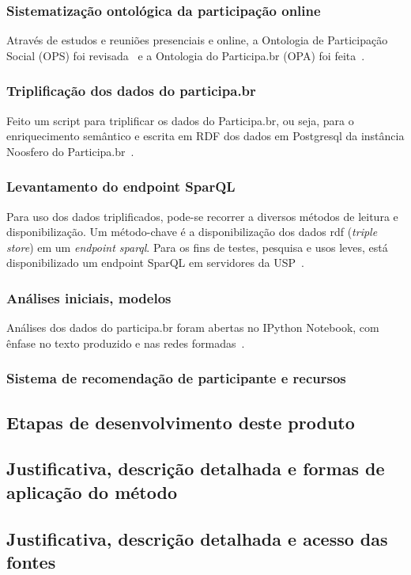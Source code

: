 \documentclass[12pt]{article}
\begin{document}
\subsubsection{Sistematização ontológica da participação online}
Através de estudos e reuniões presenciais e online, a Ontologia de Participação Social (OPS) foi revisada~\cite{OPS} e a Ontologia do Participa.br (OPA) foi feita~\cite{OPA}.
\subsubsection{Triplificação dos dados do participa.br}
Feito um script para triplificar os dados do Participa.br, ou seja, para o enriquecimento semântico e escrita em RDF dos dados em Postgresql da instância Noosfero do Participa.br~\cite{triplifica}.
\subsubsection{Levantamento do endpoint SparQL}\label{sec:sfoo}
Para uso dos dados triplificados, pode-se recorrer a diversos métodos de leitura e disponibilização. Um método-chave é a disponibilização dos dados rdf (\emph{triple store}) em um \emph{endpoint sparql}. Para os fins de testes, pesquisa e usos leves, está disponibilizado um endpoint SparQL em servidores da USP~\cite{endpoint}.
\subsubsection{Análises iniciais, modelos}
Análises dos dados do participa.br foram abertas no IPython Notebook, com ênfase no texto produzido e nas redes formadas~\cite{repoProd3}.
\subsubsection{Sistema de recomendação de participante e recursos}
\subsection{Etapas de desenvolvimento deste produto}
\subsection{Justificativa, descrição detalhada e formas de aplicação do método}
\subsection{Justificativa, descrição detalhada e acesso das fontes}
\end{document}
